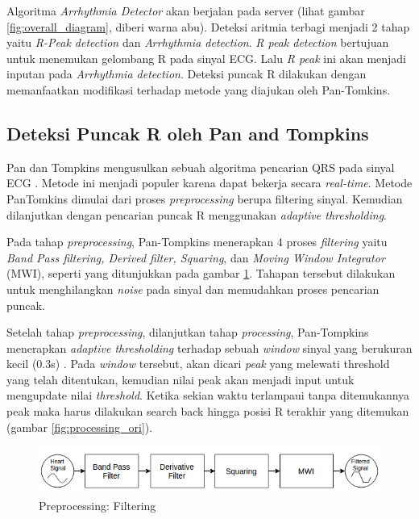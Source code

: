\documentclass[]{indojc_single}
\begin{document}
Algoritma \textit{Arrhythmia Detector} akan berjalan pada server (lihat gambar \ref{fig:overall_diagram}, diberi warna abu). Deteksi aritmia terbagi menjadi 2 tahap yaitu \textit{R-Peak detection} dan \textit{Arrhythmia detection}. \textit{R peak detection} bertujuan untuk menemukan gelombang R pada sinyal ECG. Lalu \textit{R peak} ini akan menjadi inputan pada \textit{Arrhythmia detection}. Deteksi puncak R dilakukan dengan memanfaatkan modifikasi terhadap metode yang diajukan oleh Pan-Tomkins.

\subsection{Deteksi Puncak R oleh Pan and Tompkins}
Pan dan Tompkins mengusulkan sebuah algoritma pencarian QRS pada sinyal ECG \cite{pantom}. Metode ini menjadi populer karena dapat bekerja secara \textit{real-time}. Metode PanTomkins dimulai dari proses \textit{preprocessing} berupa filtering sinyal. Kemudian dilanjutkan dengan pencarian puncak R menggunakan \textit{adaptive thresholding}. 

Pada tahap \textit{preprocessing}, Pan-Tompkins menerapkan 4 proses \textit{filtering} yaitu \textit{Band Pass filtering, Derived filter, Squaring}, dan \textit{Moving Window Integrator} (MWI), seperti yang ditunjukkan pada gambar \ref{fig:preprocessing}. Tahapan tersebut dilakukan untuk menghilangkan \textit{noise} pada sinyal dan memudahkan proses pencarian puncak. 

Setelah tahap \textit{preprocessing}, dilanjutkan tahap \textit{processing}, Pan-Tompkins menerapkan \textit{adaptive thresholding} terhadap sebuah \textit{window} sinyal yang berukuran kecil (0.3s) \cite{pantom}. Pada \textit{window} tersebut, akan dicari \textit{peak} yang melewati threshold yang telah ditentukan, kemudian nilai peak akan menjadi input untuk  mengupdate nilai \textit{threshold}. Ketika sekian waktu terlampaui tanpa ditemukannya peak maka harus dilakukan search back hingga posisi R terakhir yang ditemukan (gambar \ref{fig:processing_ori}).

\begin{figure}[htbp]
\centerline{\includegraphics[scale=0.65]{images/preprocessing.png}}
\caption{Preprocessing: Filtering}
\label{fig:preprocessing}
\end{figure}
\end{document}
